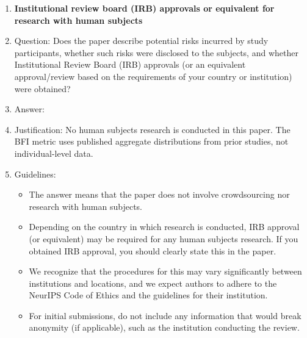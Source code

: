 \begin{enumerate}
\item {\bf Institutional review board (IRB) approvals or equivalent for research with human subjects}
    \item[] Question: Does the paper describe potential risks incurred by study participants, whether such risks were disclosed to the subjects, and whether Institutional Review Board (IRB) approvals (or an equivalent approval/review based on the requirements of your country or institution) were obtained?
    \item[] Answer: \answerNA{}
    \item[] Justification: No human subjects research is conducted in this paper. The BFI metric uses published aggregate distributions from prior studies, not individual-level data.
    \item[] Guidelines:
    \begin{itemize}
        \item The answer \answerNA{} means that the paper does not involve crowdsourcing nor research with human subjects.
        \item Depending on the country in which research is conducted, IRB approval (or equivalent) may be required for any human subjects research. If you obtained IRB approval, you should clearly state this in the paper. 
        \item We recognize that the procedures for this may vary significantly between institutions and locations, and we expect authors to adhere to the NeurIPS Code of Ethics and the guidelines for their institution. 
        \item For initial submissions, do not include any information that would break anonymity (if applicable), such as the institution conducting the review.
    \end{itemize}


\end{enumerate}
